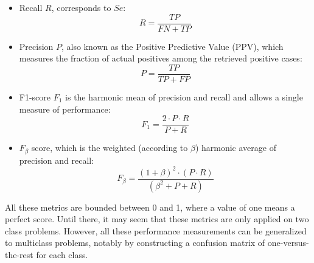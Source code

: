 \documentclass[a4paper,10pt]{article}
\begin{document}
\begin{itemize}
\item Recall $R$, corresponds to $Se$:
\begin{equation}
R = \frac{TP}{FN+TP}
\end{equation}
\item Precision $P$, also known as the Positive Predictive Value (PPV), which measures the fraction of actual positives among the retrieved positive cases:
\begin{equation}
P = \frac{TP}{TP+FP}
\end{equation}
\item F1-score $F_1$ is the harmonic mean of precision and recall and allows a single measure of performance:
\begin{equation}
F_1 = \frac{2 \cdot P \cdot R}{P + R}
\end{equation}
\item $F_\beta$ score, which is the weighted (according to $\beta$) harmonic average of precision and recall:
\begin{equation}
F_{\beta} = \frac{(1+ \beta)^2 \cdot (P \cdot R)}{(\beta^2 + P + R)}
\end{equation}
\end{itemize}

All these metrics are bounded between 0 and 1, where a value of one means a perfect score.
Until there, it may seem that these metrics are only applied on two class problems. However, all these performance measurements can be generalized to multiclass problems, notably by constructing a confusion matrix of one-versus-the-rest for each class.


\end{document}
